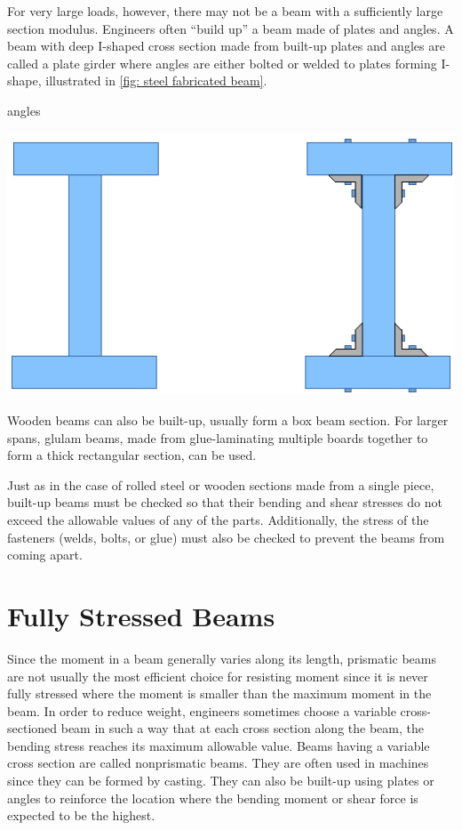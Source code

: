 \documentclass[a4paper,openany,12pt]{book}
\begin{document}
{{For very large loads, however, there may not be a beam with a
sufficiently large section modulus. Engineers often ``build up'' a beam
made of plates and angles. A beam with deep I-shaped cross section made
from built-up plates and angles are called a plate girder where angles
are either bolted or welded to plates forming I-shape, illustrated in
\ref{fig: steel fabricated beam}.


angles
\begin{center}
\includegraphics[width=.9\linewidth]{pictures/Simple-load-bearing/steel-fab-beams.pdf}
\label{fig: steel fabricated beam}
\end{center}

Wooden beams can also be built-up, usually form a box beam section. For
larger spans, glulam beams, made from glue-laminating multiple boards
together to form a thick rectangular section, can be used.

Just as in the case of rolled steel or wooden sections made from a
single piece, built-up beams must be checked so that their bending and
shear stresses do not exceed the allowable values of any of the parts.
Additionally, the stress of the fasteners (welds, bolts, or glue) must
also be checked to prevent the beams from coming apart.

\section{Fully Stressed Beams}
\label{fully-stressed-beams}
Since the moment in a beam generally varies along its length, prismatic
beams are not usually the most efficient choice for resisting moment
since it is never fully stressed where the moment is smaller than the
maximum moment in the beam. In order to reduce weight, engineers
sometimes choose a variable cross-sectioned beam in such a way that at
each cross section along the beam, the bending stress reaches its
maximum allowable value. Beams having a variable cross section are
called nonprismatic beams. They are often used in machines since they
can be formed by casting. They can also be built-up using plates or
angles to reinforce the location where the bending moment or shear force
is expected to be the highest.

}}
\end{document}
